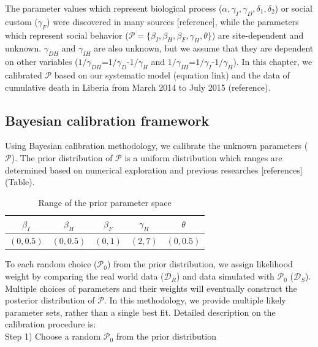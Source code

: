 The parameter values which represent biological process ($\alpha, \gamma_{I}, \gamma_{D}, \delta_{1}, \delta_{2}$) or social custom ($\gamma_{F}$) were discovered in many sources [reference], while the parameters which represent social behavior ($\mathcal{P}=\{\beta_{I}, \beta_{H}, \beta_{F}, \gamma_{H}, \theta\}$) are site-dependent and unknown. $\gamma_{DH}$ and $\gamma_{IH}$ are also unknown, but we assume that they are dependent on other variables ($1/\gamma_{DH}$=$1/\gamma_{D}$-$1/\gamma_{H}$ and $1/\gamma_{IH}$=$1/\gamma_{I}$-$1/\gamma_{H}$). In this chapter, we calibrated $\mathcal{P}$ based on our systematic model (equation link) and the data of cumulative death in Liberia from March 2014 to July 2015 (reference).
\subsection{Bayesian calibration framework}
Using Bayesian calibration methodology, we calibrate the unknown parameters ($\mathcal{P}$). The prior distribution of $\mathcal{P}$ is a uniform distribution which ranges are determined based on numerical exploration and previous researches [references] (Table). \\

\begin{table}[ht]
\caption{Range of the prior parameter space} %
\centering %
\begin{tabular}{c c c c c}
\hline\hline %
$\beta_{I}$ & $\beta_{H}$ & $\beta_{F}$ & $\gamma_{H}$ & $\theta$ \\ [0.5ex]
\hline %
$(0,0.5)$ & $(0,0.5)$ & $(0,1)$ & $(2,7)$ & $(0,0.5)$ \\ [0.5ex]
\hline
\end{tabular}
\label{tab:Prior Ranges}
\end{table}


To each random choice ($\mathcal{P}_0$) from the prior distribution, we assign likelihood weight by comparing the real world data ($\mathcal{D}_R$) and data simulated with $\mathcal{P}_0$ ($\mathcal{D}_S$). Multiple choices of parameters and their weights will eventually construct the posterior distribution of $\mathcal{P}$. In this methodology, we provide multiple likely parameter sets, rather than a single best fit. Detailed description on the calibration procedure is:\\

Step 1) Choose a random $\mathcal{P}_0$ from the prior distribution

